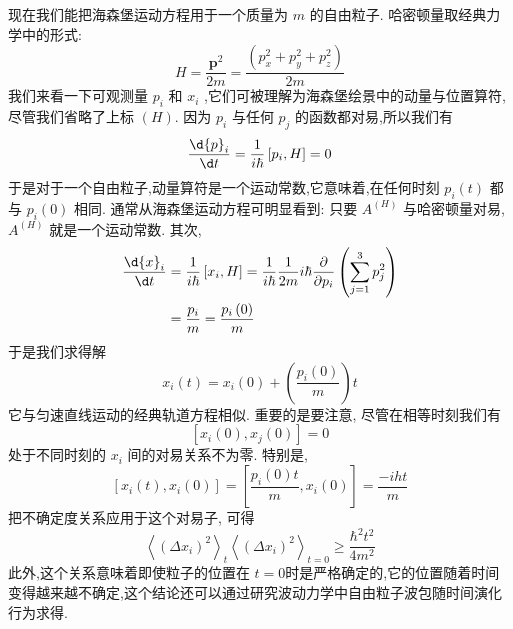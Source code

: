 现在我们能把海森堡运动方程用于一个质量为 $m$ 的自由粒子. 哈密顿量取经典力学中的形式:
\begin{equation}
	H = \frac{{\mathbf{p}}^{2}}{2m} = \frac{\left( {p}_{x}^{2} + {p}_{y}^{2} + {p}_{z}^{2}\right) }{2m}
\end{equation}
我们来看一下可观测量 ${p}_{i}$ 和 ${x}_{i}$ ,它们可被理解为海森堡绘景中的动量与位置算符,尽管我们省略了上标 $\left( H\right)$. 因为 ${p}_{i}$ 与任何 ${p}_{j}$ 的函数都对易,所以我们有
\begin{equation}
	\frac{\d{p}_{i}}{\d t} = \frac{1}{i\hbar }\left\lbrack {{p}_{i}, H}\right\rbrack = 0
\end{equation}
于是对于一个自由粒子,动量算符是一个运动常数,它意味着,在任何时刻 ${p}_{i}\left( t\right)$ 都与 ${p}_{i}\left( 0\right)$ 相同. 通常从海森堡运动方程可明显看到: 只要 ${A}^{\left( H\right) }$ 与哈密顿量对易, ${A}^{\left( H\right) }$ 就是一个运动常数. 其次,
\begin{equation}
	\begin{aligned}
		\frac{\d{x}_{i}}{\d t} &= \frac{1}{i\hbar }\left\lbrack {{x}_{i}, H}\right\rbrack = \frac{1}{i\hbar }\frac{1}{2m}i\hbar \frac{\partial }{\partial {p}_{i}}\left( {\mathop{\sum }\limits_{{j = 1}}^{3}{p}_{j}^{2}}\right)\\
		&= \frac{{p}_{i}}{m} = \frac{{p}_{i}\left( 0\right) }{m}
	\end{aligned}
\end{equation}
于是我们求得解
\begin{equation}
	{x}_{i}\left( t\right) = {x}_{i}\left( 0\right) + \left( \frac{{p}_{i}\left( 0\right) }{m}\right) t
\end{equation}
它与匀速直线运动的经典轨道方程相似. 重要的是要注意, 尽管在相等时刻我们有
\begin{equation}
	\left\lbrack {{x}_{i}\left( 0\right) ,{x}_{j}\left( 0\right) }\right\rbrack = 0
\end{equation}
处于不同时刻的 ${x}_{i}$ 间的对易关系不为零. 特别是,
\begin{equation}
	\left\lbrack {{x}_{i}\left( t\right) ,{x}_{i}\left( 0\right) }\right\rbrack = \left\lbrack {\frac{{p}_{i}\left( 0\right) t}{m},{x}_{i}\left( 0\right) }\right\rbrack = \frac{-{iht}}{m}
\end{equation}
把不确定度关系应用于这个对易子, 可得
\begin{equation}
	{\left\langle {\left( \Delta {x}_{i}\right) }^{2}\right\rangle }_{t}{\left\langle {\left( \Delta {x}_{i}\right) }^{2}\right\rangle }_{t = 0} \geq \frac{{\hbar }^{2}{t}^{2}}{4{m}^{2}}
\end{equation}
此外,这个关系意味着即使粒子的位置在 $t = 0$时是严格确定的,它的位置随着时间变得越来越不确定,这个结论还可以通过研究波动力学中自由粒子波包随时间演化行为求得.

